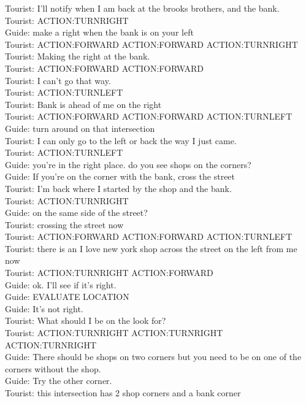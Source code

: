 Tourist: I’ll notify when I am back at the brooks brothers, and the bank.\\ Tourist: ACTION:TURNRIGHT \\
Guide: make a right when the bank is on your left \\
Tourist: ACTION:FORWARD ACTION:FORWARD ACTION:TURNRIGHT \\
Tourist: Making the right at the bank. \\
Tourist: ACTION:FORWARD ACTION:FORWARD \\
Tourist: I can’t go that way. \\
Tourist: ACTION:TURNLEFT \\
Tourist: Bank is ahead of me on the right \\
Tourist: ACTION:FORWARD ACTION:FORWARD ACTION:TURNLEFT \\
Guide: turn around on that intersection \\
Tourist: I can only go to the left or back the way I just came. \\
Tourist: ACTION:TURNLEFT \\
Guide: you’re in the right place. do you see shops on the corners? \\
Guide: If you’re on the corner with the bank, cross the street \\
Tourist: I’m back where I started by the shop and the bank. \\
Tourist: ACTION:TURNRIGHT \\
Guide: on the same side of the street? \\
Tourist: crossing the street now \\
Tourist: ACTION:FORWARD ACTION:FORWARD ACTION:TURNLEFT \\
Tourist: there is an I love new york shop across the street on the left from me now \\
Tourist: ACTION:TURNRIGHT ACTION:FORWARD \\
Guide: ok. I’ll see if it’s right. \\
Guide: EVALUATE LOCATION \\
Guide: It’s not right. \\
Tourist: What should I be on the look for? \\
Tourist: ACTION:TURNRIGHT ACTION:TURNRIGHT ACTION:TURNRIGHT \\
Guide: There should be shops on two corners but you need to be on one of the corners without the shop. \\
Guide: Try the other corner. \\
Tourist: this intersection has 2 shop corners and a bank corner \\

